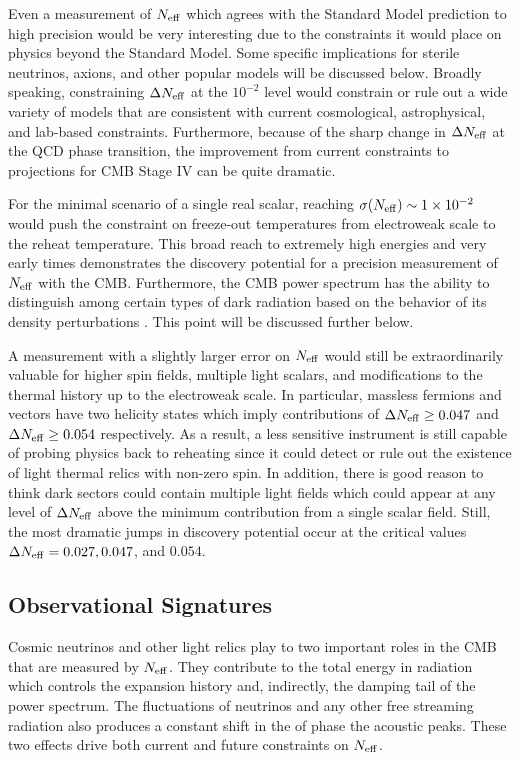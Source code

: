 Even a measurement of $N_{\rm eff}$ which agrees with the Standard Model prediction to high precision would be very interesting due to the constraints it would place on physics beyond the Standard Model.  Some specific implications for sterile neutrinos, axions, and other popular models will be discussed below.  Broadly speaking, constraining $\Delta N_{\rm eff}$ at the $10^{-2}$ level would constrain or rule out a wide variety of models that are consistent with current cosmological, astrophysical, and lab-based constraints.  Furthermore, because of the sharp change in $\Delta N_{\rm eff}$ at the QCD phase transition, the improvement from current constraints to projections for CMB Stage IV can be quite dramatic.

For the minimal scenario of a single real scalar, reaching $\sigma(N_{\rm eff}) \sim 1\times 10^{-2}$ would push the constraint on freeze-out temperatures from electroweak scale to the reheat temperature.  This broad reach to extremely high energies and very early times demonstrates the discovery potential for a precision measurement of $N_{\rm eff}$ with the CMB.  Furthermore, the CMB power spectrum has the ability to distinguish among certain types of dark radiation based on the behavior of its density perturbations  \cite{Chacko:2015noa,Baumann:2015rya}.  This point will be discussed further below.

A measurement with a slightly larger error on $N_{\rm eff}$ would still be extraordinarily valuable for higher spin fields, multiple light scalars, and modifications to the thermal history up to the electroweak scale.  In particular, massless fermions and vectors have two helicity states which imply contributions of $\Delta N_{\rm eff}  \geq 0.047$ and $\Delta N_{\rm eff}  \geq 0.054$ respectively.  As a result, a less sensitive instrument is still capable of probing physics back to reheating since it could detect or rule out the existence of light thermal relics with non-zero spin.  In addition, there is good reason to think dark sectors could contain multiple light fields which could appear at any level of $\Delta N_{\rm eff}$ above the minimum contribution from a single scalar field.  Still, the most dramatic jumps in discovery potential occur at the critical values $\Delta N_{\rm eff} = 0.027, 0.047$, and $0.054$.  

\subsection{Observational Signatures}\label{sec:Neffsignatures}

Cosmic neutrinos and other light relics play to two important roles in the CMB that are measured by $N_{\rm eff}$.  They contribute to the total energy in radiation which controls the expansion history and, indirectly, the damping tail of the power spectrum.  The fluctuations of neutrinos and any other free streaming radiation also produces a constant shift in the of phase the acoustic peaks.  These two effects drive both current and future constraints on $N_{\rm eff}$.  

